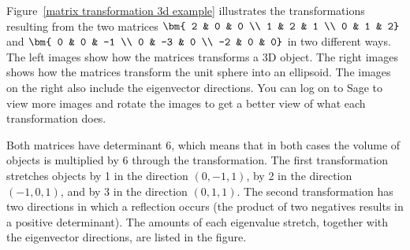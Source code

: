 \begin{example}\label{3d transformation example}
Figure~\ref{matrix transformation 3d example} illustrates the transformations resulting from the two matrices $\bm{ 2 & 0 & 0 \\ 1 & 2 & 1 \\ 0 & 1 & 2}$
and 
$\bm{ 0 & 0 & -1 \\ 0 & -3 & 0 \\ -2 & 0 & 0}$ in two different ways.  The left images show how the matrices transforms a 3D object.  The right images shows how the matrices transform the unit sphere into an ellipsoid.  The images on the right also include the eigenvector directions. You can log on to Sage to view more images and rotate the images to get a better view of what each transformation does. 

Both matrices have determinant 6, which means that in both cases the volume of objects is multiplied by 6 through the transformation.  The first transformation stretches objects by 1 in the direction $(0,-1,1)$, by 2 in the direction $(-1,0,1)$, and by 3 in the direction $(0,1,1)$.  The second transformation has two directions in which a reflection occurs (the product of two negatives results in a positive determinant).  The amounts of each eigenvalue stretch, together with the eigenvector directions, are listed in the figure.



\end{example}
